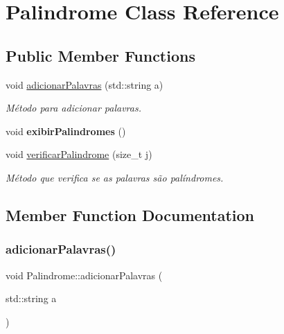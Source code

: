 \hypertarget{classPalindrome}{}\section{Palindrome Class Reference}
\label{classPalindrome}
\subsection*{Public Member Functions}
\begin{DoxyCompactItemize}
\item 
void \mbox{\hyperlink{classPalindrome_a2d5bb7ca52285324ac8da50edd1d4a56}{adicionar\+Palavras}} (std\+::string a)
\begin{DoxyCompactList}\small\item\em Método para adicionar palavras. \end{DoxyCompactList}\item 
\mbox{\label{classPalindrome_a0bd9776612a989f61ef7c155ef4b7fce}} 
void {\bfseries exibir\+Palindromes} ()
\item 
void \mbox{\hyperlink{classPalindrome_ad8e712dbed0404e1e123333546954a4f}{verificar\+Palindrome}} (size\+\_\+t j)
\begin{DoxyCompactList}\small\item\em Método que verifica se as palavras são palíndromes. \end{DoxyCompactList}\end{DoxyCompactItemize}


\subsection{Member Function Documentation}
\mbox{\label{classPalindrome_a2d5bb7ca52285324ac8da50edd1d4a56}} 
\subsubsection{\texorpdfstring{adicionar\+Palavras()}{adicionarPalavras()}}
{\footnotesize\ttfamily void Palindrome\+::adicionar\+Palavras (\begin{DoxyParamCaption}\item[{std\+::string}]{a }\end{DoxyParamCaption})}



